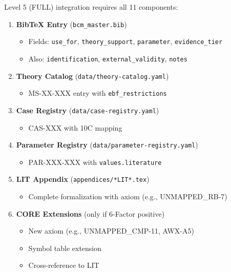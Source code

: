 Level 5 (FULL) integration requires all 11 components:

\begin{enumerate}
    \item \textbf{BibTeX Entry} (\texttt{bcm\_master.bib})
    \begin{itemize}
        \item Fields: \texttt{use\_for}, \texttt{theory\_support}, \texttt{parameter}, \texttt{evidence\_tier}
        \item Also: \texttt{identification}, \texttt{external\_validity}, \texttt{notes}
    \end{itemize}

    \item \textbf{Theory Catalog} (\texttt{data/theory-catalog.yaml})
    \begin{itemize}
        \item MS-XX-XXX entry with \texttt{ebf\_restrictions}
    \end{itemize}

    \item \textbf{Case Registry} (\texttt{data/case-registry.yaml})
    \begin{itemize}
        \item CAS-XXX with 10C mapping
    \end{itemize}

    \item \textbf{Parameter Registry} (\texttt{data/parameter-registry.yaml})
    \begin{itemize}
        \item PAR-XXX-XXX with \texttt{values.literature}
    \end{itemize}

    \item \textbf{LIT Appendix} (\texttt{appendices/*LIT*.tex})
    \begin{itemize}
        \item Complete formalization with axiom (e.g., UNMAPPED_RB-7)
    \end{itemize}

    \item \textbf{CORE Extensions} (only if 6-Factor positive)
    \begin{itemize}
        \item New axiom (e.g., UNMAPPED_CMP-11, AWX-A5)
        \item Symbol table extension
        \item Cross-reference to LIT
    \end{itemize}


\end{enumerate}

